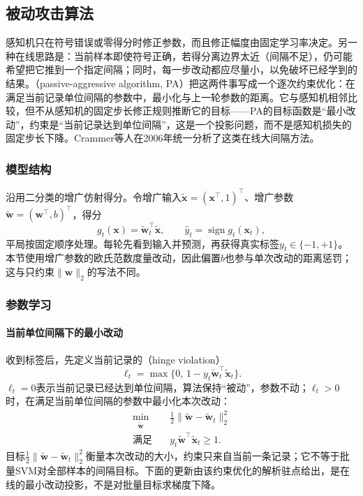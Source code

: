 \subsection{被动攻击算法}
\label{sec:classification-pa}

感知机只在符号错误或零得分时修正参数，而且修正幅度由固定学习率决定。另一种在线思路是：当前样本即使符号正确，若得分离边界太近（间隔不足），仍可能希望把它推到一个指定间隔；同时，每一步改动都应尽量小，以免破坏已经学到的结果。（passive-aggressive algorithm, PA）把这两件事写成一个逐次约束优化：在满足当前记录单位间隔的参数中，最小化与上一轮参数的距离。它与感知机相邻比较，但不从感知机的固定步长修正规则推断它的目标——PA的目标函数是“最小改动”，约束是“当前记录达到单位间隔”，这是一个投影问题，而不是感知机损失的固定步长下降。Crammer等人在2006年统一分析了这类在线大间隔方法。

\subsubsection{模型结构}
\label{sec:classification-pa-structure}

沿用二分类的增广仿射得分。令增广输入$\tilde{\bm{x}}=(\bm{x}^{\top},1)^{\top}$、增广参数$\tilde{\bm{w}}=(\bm{w}^{\top},b)^{\top}$，得分
\begin{equation}
  g_t(\bm{x})=\tilde{\bm{w}}_t^{\top}\tilde{\bm{x}},
  \qquad
  \hat y_t=\operatorname{sign}g_t(\bm{x}_t),
\end{equation}
平局按固定顺序处理。每轮先看到输入并预测，再获得真实标签$y_t\in\{-1,+1\}$。本节使用增广参数的欧氏范数度量改动，因此偏置$b$也参与单次改动的距离惩罚；这与只约束$\|\bm{w}\|_2$的写法不同。

\subsubsection{参数学习}
\label{sec:classification-pa-learning}

\paragraph{当前单位间隔下的最小改动}
收到标签后，先定义当前记录的（hinge violation）
\begin{equation}
  \ell_t=\max\{0,\,1-y_t\tilde{\bm{w}}_t^{\top}\tilde{\bm{x}}_t\}.
  \label{eq:classification-pa-violation}
\end{equation}
$\ell_t=0$表示当前记录已经达到单位间隔，算法保持“被动”，参数不动；$\ell_t>0$时，在满足当前单位间隔的参数中最小化本次改动：
\begin{equation}
  \begin{aligned}
    \min_{\tilde{\bm{w}}}\quad&
      \tfrac12\|\tilde{\bm{w}}-\tilde{\bm{w}}_t\|_2^2\\
    \text{满足}\quad&
      y_t\tilde{\bm{w}}^{\top}\tilde{\bm{x}}_t\geq1 .
  \end{aligned}
  \label{eq:classification-pa-projection}
\end{equation}
目标$\tfrac12\|\tilde{\bm{w}}-\tilde{\bm{w}}_t\|_2^2$衡量本次改动的大小，约束只来自当前一条记录；它不等于批量SVM对全部样本的间隔目标。下面的更新由该约束优化的解析驻点给出，是在线的最小改动投影，不是对批量目标求梯度下降。

